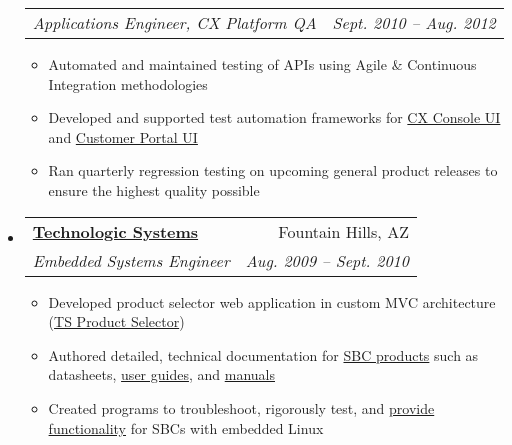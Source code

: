 \documentclass[letterpaper,11pt]{article}
\makeatletter
\newcommand{\resitem}[1]{\item #1 \vspace{-2pt}}
\newcommand{\ressubheading}[4]{
\begin{tabular*}{6.5in}{l@{\extracolsep{\fill}}r}
		\textbf{#1} & #2 \\
		\textit{#3} & \textit{#4} \\
\end{tabular*}\vspace{-6pt}}
\newcommand{\ressubsubheading}[2]{
\begin{tabular*}{6.5in}{l@{\extracolsep{\fill}}r}
		\textit{#1} & \textit{#2} \\
\end{tabular*}\vspace{-6pt}}
\makeatother
\begin{document}
\begin{itemize}
			\ressubsubheading{Applications Engineer, CX Platform QA}{Sept. 2010 -- Aug. 2012}
				{ \footnotesize
				\begin{itemize}
					\resitem{Automated and maintained testing of APIs using Agile \& Continuous Integration methodologies}
					\resitem{Developed and supported test automation frameworks for \href{http://www.rightnow.com/resource-demo-desktop-workflow.php}{CX Console UI} and \href{http://www.oracle.com/us/products/applications/rightnow/web-experience/web-self-service/overview/index.html}{Customer Portal UI}}
					\resitem{Ran quarterly regression testing on upcoming general product releases to ensure the highest quality possible}
				\end{itemize}
				}
\begin{comment}
		\item			
			\ressubheading{Independent Contractor}{Bozeman, MT}{Computer Engineering Contractor}{Sept. 2010 -- Present}
				{ \footnotesize				
				\begin{itemize}
					\item \textbf{Clients:} Technologic Systems, S\&S Machine, Jares Fencing, Neumann Realty
					\item Develop software and/or web applications to automate or enhance existing frameworks
					\item Consult with clients to find best solutions and teach best practices
					\item Maintain web presence, author documentation, and administrate online systems 
				\end{itemize}
				}
\end{comment}
		\item 
			\ressubheading{\href{http://www.embeddedarm.com}{Technologic Systems}}{Fountain Hills, AZ}{Embedded Systems Engineer}{Aug. 2009 -- Sept. 2010}
				{ \footnotesize
				\begin{itemize}
					\resitem{Developed product selector web application in custom MVC architecture (\href{http://embeddedarm.com/products/product-selector.php}{TS Product Selector})}
					\resitem{Authored detailed, technical documentation for \href{http://www.embeddedarm.com/products/index.php}{SBC products} such as datasheets,  \href{http://www.embeddedarm.com/about/resource.php?item=410}{user guides}, and \href{http://www.embeddedarm.com/about/resource.php?item=409}{manuals}}
					\resitem{Created programs to troubleshoot, rigorously test, and \href{ftp://ftp.embeddedarm.com/ts-arm-sbc/ts-7500-linux/samples/sbus.c}{provide functionality} for SBCs with embedded Linux}

\end{itemize}}
\end{itemize}
\end{document}
